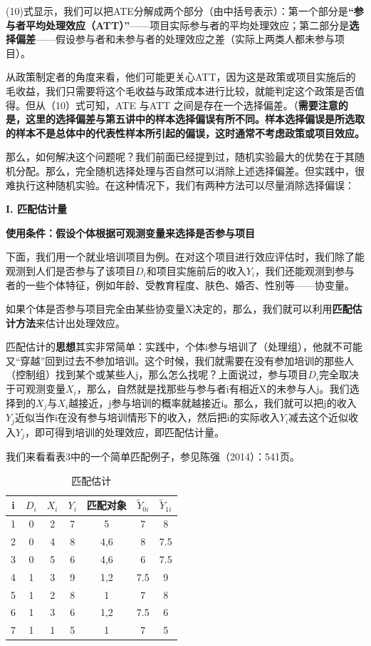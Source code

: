 \documentclass[cn,10pt,math=newtx,citestyle=gb7714-2015,bibstyle=gb7714-2015]{elegantbook}
\begin{document}
	(10)式显示，我们可以把ATE分解成两个部分（由中括号表示）：第一个部分是\textbf{“参与者平均处理效应（ATT）”}——项目实际参与者的平均处理效应；第二部分是\textbf{选择偏差}——假设参与者和未参与者的处理效应之差（实际上两类人都未参与项目）。
	
	从政策制定者的角度来看，他们可能更关心ATT，因为这是政策或项目实施后的毛收益，我们只需要将这个毛收益与政策成本进行比较，就能判定这个政策是否值得。但从（10）式可知，ATE 与ATT 之间是存在一个选择偏差。（\textbf{需要注意的是，这里的选择偏差与第五讲中的样本选择偏误有所不同。样本选择偏误是所选取的样本不是总体中的代表性样本所引起的偏误，这时通常不考虑政策或项目效应。}
	
	那么，如何解决这个问题呢？我们前面已经提到过，随机实验最大的优势在于其随机分配。那么，完全随机选择处理与否自然可以消除上述选择偏差。但实践中，很难执行这种随机实验。在这种情况下，我们有两种方法可以尽量消除选择偏误：
	
	\textbf{I. 匹配估计量}
	
	\textbf{使用条件：假设个体根据可观测变量来选择是否参与项目}
	
	下面，我们用一个就业培训项目为例。在对这个项目进行效应评估时，我们除了能观测到人们是否参与了该项目$D_i$和项目实施前后的收入$Y_i$，我们还能观测到参与者的一些个体特征，例如年龄、受教育程度、肤色、婚否、性别等——协变量。
	
	如果个体是否参与项目完全由某些协变量X决定的，那么，我们就可以利用\textbf{匹配估计方法}来估计出处理效应。
	
	匹配估计的\textbf{思想}其实非常简单：实践中，个体i参与培训了（处理组），他就不可能又“穿越”回到过去不参加培训。这个时候，我们就需要在没有参加培训的那些人（控制组）找到某个或某些人j，那么怎么找呢？上面说过，参与项目$D_i$完全取决于可观测变量$X_i$，那么，自然就是找那些与参与者i有相近X的未参与人j。我们选择到的$X_j$与$X_i$越接近，j参与培训的概率就越接近i。那么，我们就可以把j的收入$Y_j$近似当作i在没有参与培训情形下的收入，然后把i的实际收入$Y_i$减去这个近似收入$Y_j$，即可得到培训的处理效应，即匹配估计量。
	
	我们来看看表3中的一个简单匹配例子，参见陈强（2014）：541页。
	
	\begin{center}
		\begin{table}[!h]
			\caption{匹配估计}\label{tab:digit}
			\begin{center}
				\begin{tabular}{c|c|c|c|c|c|c}
					\hline
					i&$D_i$&$X_i$&$Y_i$&匹配对象&$\tilde{Y}_{0i}$&$\tilde{Y}_{1i}$\\
					\hline
					1&0&2&7&{5}&7&8\\
					\hline
					2&0&4&8&{4,6}&8&7.5\\
					\hline
					3&0&5&6&{4,6}&6&7.5\\
					\hline
					4&1&3&9&{1,2}&7.5&9\\
					\hline
					5&1&2&8&{1}&7&8\\
					\hline
					6&1&3&6&{1,2}&7.5&6\\
					\hline
					7&1&1&5&{1}&7&5\\
					\hline
				\end{tabular}
			\end{center}
		\end{table}
	\end{center}
	
\end{document}
